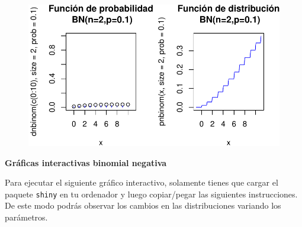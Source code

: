 \documentclass[
  letterpaper,
  DIV=11,
  numbers=noendperiod]{scrreprt}
\begin{document}
\begin{figure}

{\centering \includegraphics{3_files/figure-pdf/unnamed-chunk-37-1.pdf}

}

\end{figure}

\textbf{Gráficas interactivas binomial negativa}

Para ejecutar el siguiente gráfico interactivo, solamente tienes que
cargar el paquete \texttt{shiny} en tu ordenador y luego copiar/pegar
las siguientes instrucciones. De este modo podrás observar los cambios
en las distribuciones variando los parámetros.
\end{document}
